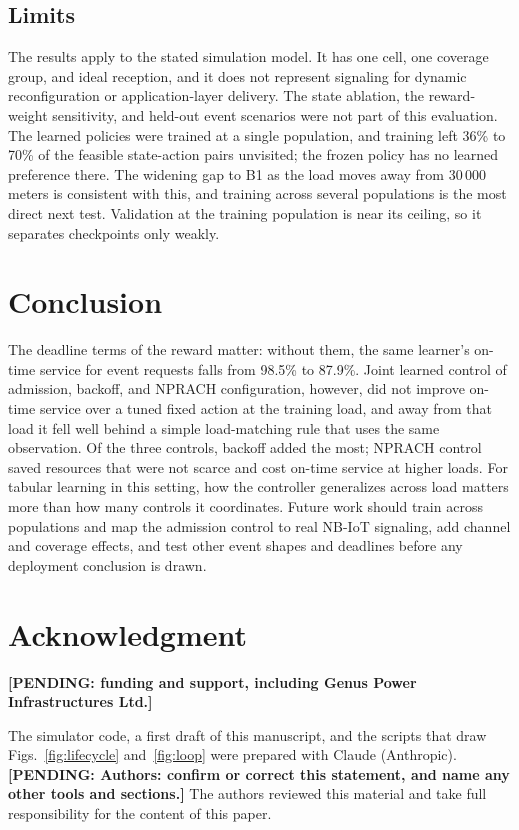 \documentclass[conference]{IEEEtran}
\newif\ifblind
\newcommand{\pending}[1]{\textbf{[PENDING: #1]}}
\begin{document}
\subsection{Limits}
The results apply to the stated simulation model. It has one cell, one coverage group,
and ideal reception, and it does not represent signaling for dynamic reconfiguration or
application-layer delivery. The state ablation, the reward-weight sensitivity, and
held-out event scenarios were not part of this evaluation. The learned policies were
trained at a single population, and training left 36\% to 70\% of the feasible
state-action pairs unvisited; the frozen policy has no learned preference there. The
widening gap to B1 as the load moves away from 30\,000 meters is consistent with this,
and training across several populations is the most direct next test. Validation at
the training population is near its ceiling, so it separates checkpoints only weakly.

\section{Conclusion}
The deadline terms of the reward matter: without them, the same learner's on-time
service for event requests falls from 98.5\% to 87.9\%. Joint learned control of admission,
backoff, and NPRACH configuration, however, did not improve on-time service over a
tuned fixed action at the training load, and away from that load it fell well
behind a simple load-matching rule that uses the same observation. Of the three
controls, backoff added the most; NPRACH control saved resources that were not
scarce and cost on-time service at higher loads. For tabular learning in this
setting, how the controller generalizes across load matters more than how many
controls it coordinates. Future work should train across populations and map the admission control to real NB-IoT signaling, add
channel and coverage effects, and test other event shapes and deadlines before any
deployment conclusion is drawn.

\section*{Acknowledgment}
\ifblind\else
\pending{funding and support, including Genus Power Infrastructures Ltd.}
\fi
The simulator code, a first draft of this manuscript, and the scripts that draw
Figs.~\ref{fig:lifecycle} and~\ref{fig:loop} were prepared with Claude (Anthropic).
\pending{Authors: confirm or correct this statement, and name any other tools and
sections.} The authors reviewed this material and take full responsibility for the
content of this paper.
\end{document}
